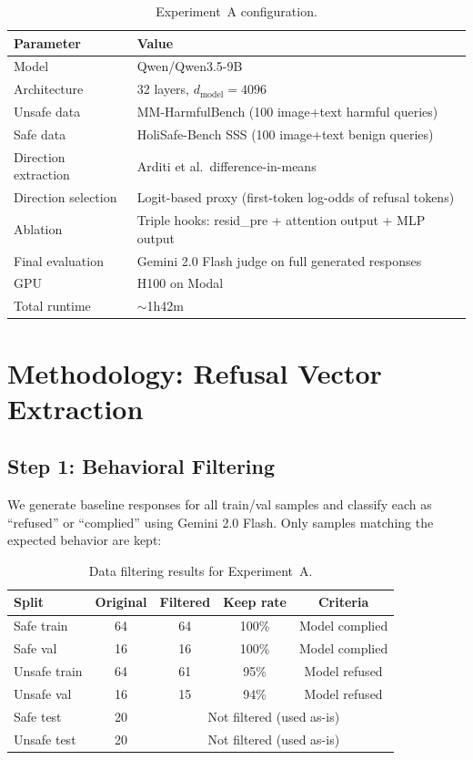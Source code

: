 \documentclass[11pt,a4paper]{article}
\begin{document}
\begin{table}[H]\centering
\caption{Experiment~A configuration.}
\begin{tabular}{ll}
\toprule
\textbf{Parameter} & \textbf{Value} \\
\midrule
Model & Qwen/Qwen3.5-9B \\
Architecture & 32 layers, $d_\text{model}=4096$ \\
Unsafe data & MM-HarmfulBench (100 image+text harmful queries) \\
Safe data & HoliSafe-Bench SSS (100 image+text benign queries) \\
Direction extraction & Arditi et al.\ difference-in-means \\
Direction selection & Logit-based proxy (first-token log-odds of refusal tokens) \\
Ablation & Triple hooks: resid\_pre + attention output + MLP output \\
Final evaluation & Gemini 2.0 Flash judge on full generated responses \\
GPU & H100 on Modal \\
Total runtime & $\sim$1h42m \\
\bottomrule
\end{tabular}
\end{table}

\section{Methodology: Refusal Vector Extraction}
\label{sec:extraction}

\subsection{Step 1: Behavioral Filtering}

We generate baseline responses for all train/val samples and classify each as ``refused'' or ``complied'' using Gemini 2.0 Flash. Only samples matching the expected behavior are kept:

\begin{table}[H]\centering
\caption{Data filtering results for Experiment~A.}
\begin{tabular}{lcccc}
\toprule
\textbf{Split} & \textbf{Original} & \textbf{Filtered} & \textbf{Keep rate} & \textbf{Criteria} \\
\midrule
Safe train   & 64 & 64 & 100\% & Model complied \\
Safe val     & 16 & 16 & 100\% & Model complied \\
Unsafe train & 64 & 61 & 95\%  & Model refused \\
Unsafe val   & 16 & 15 & 94\%  & Model refused \\
\midrule
Safe test    & 20 & \multicolumn{3}{c}{Not filtered (used as-is)} \\
Unsafe test  & 20 & \multicolumn{3}{c}{Not filtered (used as-is)} \\
\bottomrule
\end{tabular}
\end{table}
\end{document}

